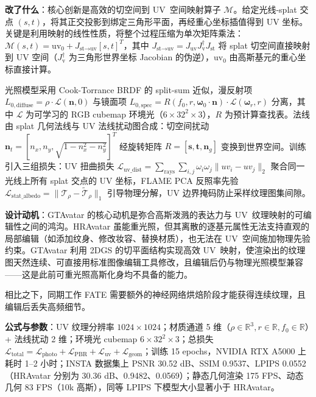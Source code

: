 \textbf{改了什么}：核心创新是高效的切空间到 UV~空间映射算子 $\mathcal{M}$。给定光线-splat 交点 $(s,t)$，将其正交投影到绑定三角形平面，再经重心坐标插值得到 UV 坐标。关键是利用映射的线性性质，将整个过程压缩为单次矩阵乘法：$\mathcal{M}(s,t) = \text{uv}_0 + J_{\text{st} \to \text{uv}} [s, t]^T$，其中 $J_{\text{st} \to \text{uv}} = J_{\text{uv}} J_{\text{v}}^{\dagger} J_{\text{st}}$ 将 splat 切空间直接映射到 UV 空间（$J_{\text{v}}^{\dagger}$ 为三角形世界坐标 Jacobian 的伪逆），$\text{uv}_0$ 由高斯基元的重心坐标直接计算。

光照模型采用 Cook-Torrance BRDF 的 split-sum 近似，漫反射项 $L_{0,\text{diffuse}} = \rho \cdot \mathcal{L}(\mathbf{n}, 0)$ 与镜面项 $L_{0,\text{spec}} = R(f_0, r, \boldsymbol{\omega}_0 \cdot \mathbf{n}) \cdot \mathcal{L}(\boldsymbol{\omega}_r, r)$ 分离，其中 $\mathcal{L}$ 为可学习的 RGB cubemap 环境光（$6 \times 32^2 \times 3$），$R$ 为预计算查找表。法线由 splat 几何法线与 UV 法线扰动图合成：切空间扰动 $\mathbf{n}_t = [n_x, n_y, \sqrt{1 - n_x^2 - n_y^2}]^T$ 经旋转矩阵 $R = [\mathbf{s}, \mathbf{t}, \mathbf{n}_g]$ 变换到世界空间。训练引入三组损失：UV 扭曲损失 $\mathcal{L}_{\text{uv\_dist}} = \sum_{\text{rays}} \sum_{i,j} \omega_i \omega_j \|uv_i - uv_j\|_2$ 聚合同一光线上所有 splat 交点的 UV 坐标，FLAME PCA 反照率先验 $\mathcal{L}_{\text{stat\_albedo}} = \|\mathcal{T}_\rho - \tilde{\mathcal{T}}_\rho\|_1$ 引导物理分解，UV 边界掩码防止采样纹理图集间隙。

\textbf{设计动机}：GTAvatar 的核心动机是弥合高斯泼溅的表达力与 UV~纹理映射的可编辑性之间的鸿沟。HRAvatar 虽能重光照，但其离散的逐基元属性无法支持直观的局部编辑（如添加纹身、修改妆容、替换材质），也无法在 UV~空间施加物理先验约束。GTAvatar 利用 2DGS 的切平面结构实现高效 UV~映射，使渲染出的纹理图天然连续、可直接用标准图像编辑工具修改，且编辑后仍与物理光照模型兼容——这是此前可重光照高斯化身均不具备的能力。

相比之下，同期工作 FATE 需要额外的神经网络烘焙阶段才能获得连续纹理，且编辑后丢失高频细节。

\textbf{公式与参数}：UV 纹理分辨率 $1024 \times 1024$；材质通道 5 维（$\rho \in \mathbb{R}^3, r \in \mathbb{R}, f_0 \in \mathbb{R}$）+ 法线扰动 2 维；环境光 cubemap $6 \times 32^2 \times 3$；总损失 $\mathcal{L}_{\text{total}} = \mathcal{L}_{\text{photo}} + \mathcal{L}_{\text{PBR}} + \mathcal{L}_{\text{uv}} + \mathcal{L}_{\text{geom}}$；训练 15 epochs，NVIDIA RTX A5000 上耗时 1--2 小时；INSTA 数据集上 PSNR 30.52 dB、SSIM 0.9537、LPIPS 0.0552（HRAvatar 分别为 30.36 dB、0.9482、0.0569）；静态几何渲染 175 FPS、动态几何 83 FPS（10k 高斯），同等 LPIPS 下模型大小显著小于 HRAvatar。

